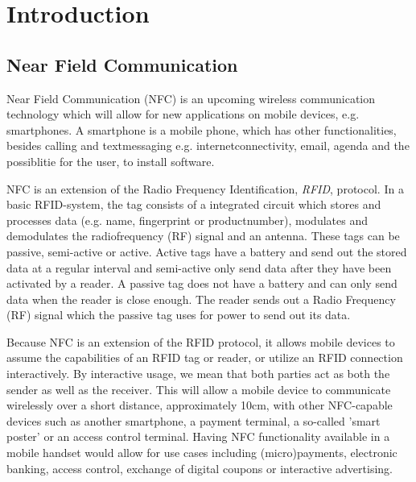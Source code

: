 \section{Introduction}


\subsection{Near Field Communication} %
Near Field Communication (NFC) is an upcoming wireless communication technology which will allow for new applications on mobile devices, e.g. smartphones. A smartphone is a mobile phone, which has other functionalities, besides calling and textmessaging e.g. internetconnectivity, email, agenda and the possiblitie for the user, to install software.

NFC is an extension of the Radio Frequency Identification, \textit{RFID}, protocol. In a basic RFID-system, the tag consists of a integrated circuit which stores and processes data (e.g. name, fingerprint or productnumber), modulates and demodulates the radiofrequency (RF) signal and an antenna. These tags can be passive, semi-active or active. Active tags have a battery and send out the stored data at a regular interval and semi-active only send data after they have been activated by a reader. A passive tag does not have a battery and can only send data when the reader is close enough. The reader sends out a Radio Frequency (RF) signal which the passive tag uses for power to send out its data.
 
Because NFC is an extension of the RFID protocol, it allows mobile devices to assume the capabilities of an RFID tag or reader, or utilize an RFID connection interactively. By interactive usage, we mean that both parties act as both the sender as well as the receiver. This will allow a mobile device to communicate wirelessly over a short distance, approximately 10cm, with other NFC-capable devices such as another smartphone, a payment terminal, a so-called 'smart poster' or an access control terminal. Having NFC functionality available in a mobile handset would allow for use cases including (micro)payments, electronic banking, access control, exchange of digital coupons or interactive advertising.

